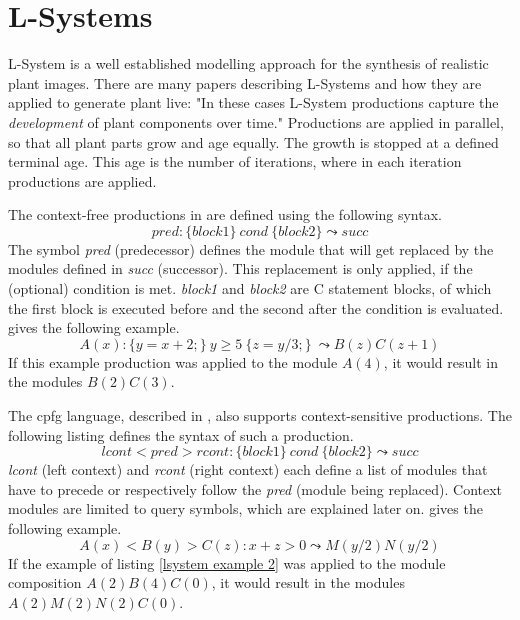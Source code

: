 \documentclass[11pt, a4paper]{report}
\begin{document}
\pagebreak
\section{L-Systems}

L-System is a well established modelling approach for the synthesis of realistic plant images. There are many papers describing L-Systems and how they are applied to generate plant live: "In these cases L-System productions capture the \textit{development} of plant components over time." \citep{PrusinkiewiczEtAl:2001} Productions are applied in parallel, so that all plant parts grow and age equally. The growth is stopped at a defined terminal age. This age is the number of iterations, where in each iteration productions are applied.

The context-free productions in \citep{PrusinkiewiczEtAl:2001} are defined using the following syntax.
\begin{equation} \label{lsystem context free}
    pred : \{block1\}\ cond\ \{block2\} \leadsto succ
\end{equation}
The symbol \textit{pred} (predecessor) defines the module that will get replaced by the modules defined in \textit{succ} (successor). This replacement is only applied, if the (optional) condition is met. \textit{block1} and \textit{block2} are C statement blocks, of which the first block is executed before and the second after the condition is evaluated. \citep{PrusinkiewiczEtAl:2001} gives the following example.
\begin{equation} \label{lsystem example 1}
    A(x) : \{y = x + 2;\}\ y \geq 5\ \{z = y / 3;\}\ \leadsto B(z)C(z + 1)
\end{equation}
If this example production was applied to the module $A(4)$, it would result in the modules $B(2)C(3)$.

The cpfg language, described in \citep{PrusinkiewiczEtAl:2001}, also supports context-sensitive productions. The following listing defines the syntax of such a production.
\begin{equation} \label{lsystem context sensitive}
    lcont < pred > rcont : \{block1\}\ cond\ \{block2\} \leadsto succ
\end{equation}
\textit{lcont} (left context) and \textit{rcont} (right context) each define a list of modules that have to precede or respectively follow the \textit{pred} (module being replaced). Context modules are limited to query symbols, which are explained later on. \citep{PrusinkiewiczEtAl:2001} gives the following example.
\begin{equation} \label{lsystem example 2}
    A(x) < B(y) > C(z) : x + z > 0 \leadsto M(y / 2)N(y / 2)
\end{equation}
If the example of listing \ref{lsystem example 2} was applied to the module composition $A(2)B(4)C(0)$, it would result in the modules $A(2)M(2)N(2)C(0)$.
\end{document}
